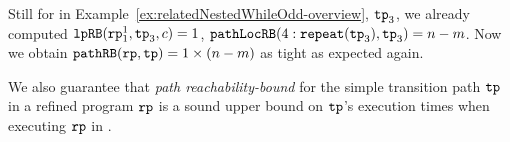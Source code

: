 Still for in Example~\ref{ex:relatedNestedWhileOdd-overview}, $\mathtt{tp}_3$, we already computed $\mathtt{lpRB}(\mathtt{rp}_1^1, \mathtt{tp}_3, c) = 1$,
$\mathtt{pathLocRB}(4: \mathtt{repeat}(\mathtt{tp}_3), \mathtt{tp}_3) = n - m$. Now we obtain $\mathtt{pathRB}(\mathtt{rp}, \mathtt{tp}) = 1 \times (n - m)$ as tight as expected again.

We also guarantee that \emph{path reachability-bound} for the simple transition path $\mathtt{tp}$ in a refined program $\mathtt{rp}$ is a sound upper bound on $\mathtt{tp}$'s execution times when executing $\mathtt{rp}$
in .
